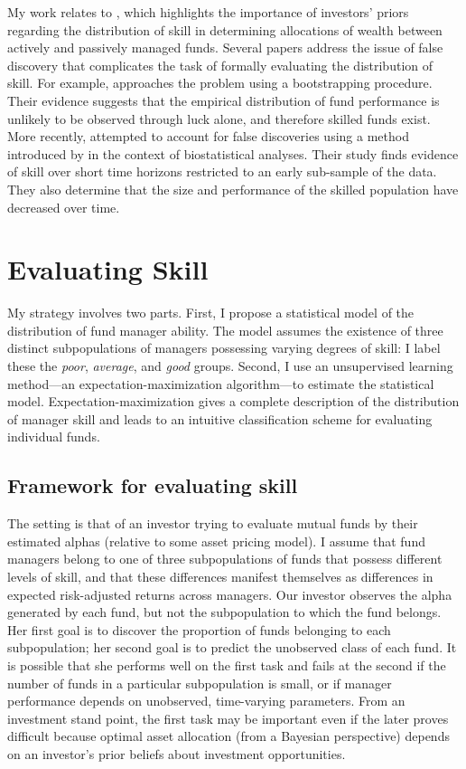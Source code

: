 	My work relates to \citet{Baks2001}, which highlights the importance of investors' priors regarding the distribution of skill in determining allocations of wealth between actively and passively managed funds. Several papers address the issue of false discovery that complicates the task of formally evaluating the distribution of skill. For example, \citet{Kosowski2006} approaches the problem using a bootstrapping procedure. Their evidence suggests that the empirical distribution of fund performance is unlikely to be observed through luck alone, and therefore skilled funds exist. More recently, \citet{Barras2010} attempted to account for false discoveries using a method introduced by \citet{Storey2002} in the context of biostatistical analyses. Their study finds evidence of skill over short time horizons restricted to an early sub-sample of the data. They also determine that the size and performance of the skilled population have decreased over time.


\section{Evaluating Skill}
	My strategy involves two parts.  First, I propose a statistical model of the distribution of fund manager ability.  The model assumes the existence of three distinct subpopulations of managers possessing varying degrees of skill: I label these the \textit{poor}, \textit{average}, and \textit{good} groups. Second, I use an unsupervised learning method---an expectation-maximization algorithm---to estimate the statistical model.  Expectation-maximization gives a complete description of the distribution of manager skill and leads to an intuitive classification scheme for evaluating individual funds.

	\subsection{Framework for evaluating skill}
		The setting is that of an investor trying to evaluate mutual funds by their estimated alphas (relative to some asset pricing model). I assume that fund managers belong to one of three subpopulations of funds that possess different levels of skill, and that these differences manifest themselves as differences in expected risk-adjusted returns across managers. Our investor observes the alpha generated by each fund, but not the subpopulation to which the fund belongs. Her first goal is to discover the proportion of funds belonging to each subpopulation; her second goal is to predict the unobserved class of each fund. It is possible that she performs well on the first task and fails at the second if the number of funds in a particular subpopulation is small, or if manager performance depends on unobserved, time-varying parameters. From an investment stand point, the first task may be important even if the later proves difficult because optimal asset allocation (from a Bayesian perspective) depends on an investor's prior beliefs about investment opportunities.

